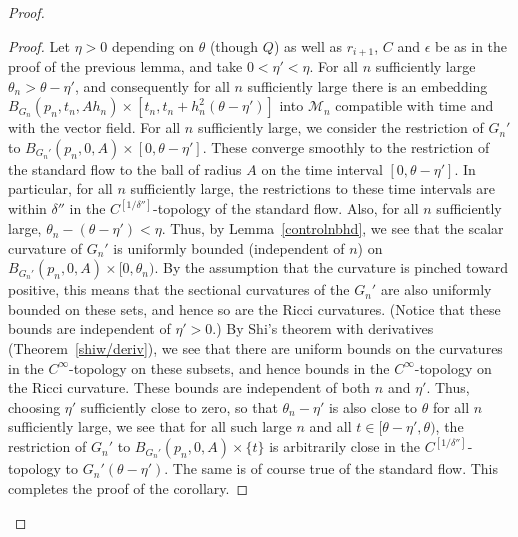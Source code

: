 \begin{proof}
\begin{proof}
Let $\eta>0$ depending on $\theta$ (though $Q$) as well as
$r_{i+1}$, $C$ and $\epsilon$ be as in the proof of the previous
lemma, and take $0<\eta'<\eta$. For all $n$ sufficiently large
$\theta_n>\theta-\eta'$, and consequently for all $n$ sufficiently
large there is an embedding $B_{G_n}(p_n,t_n,Ah_n)\times
[t_n,t_n+h_n^2(\theta-\eta')]$ into ${\mathcal M}_n$ compatible with
time and with the vector field. For all $n$ sufficiently large, we
consider the restriction of $G_n'$ to $B_{G_n'}(p_n,0,A)\times
[0,\theta-\eta']$. These converge smoothly to the restriction of the
standard flow to the ball of radius $A$ on the time interval
$[0,\theta-\eta']$. In particular, for all $n$ sufficiently large,
the restrictions to these time intervals are within $\delta''$ in
the $C^{[1/\delta'']}$-topology of the standard flow. Also, for all $n$ sufficiently
large, $\theta_n-(\theta-\eta')<\eta$. Thus, by
Lemma~\ref{controlnbhd}, we see that the scalar curvature of $G_n'$
is uniformly bounded (independent of $n$) on
$B_{G_n'}(p_n,0,A)\times [0,\theta_n)$. By the assumption that the
curvature is pinched toward positive, this means that the sectional
curvatures of the $G_n'$ are also uniformly bounded on these sets,
and hence so are the Ricci curvatures. (Notice that these bounds are
independent of $\eta'>0$.) By Shi's theorem with derivatives
(Theorem~\ref{shiw/deriv}), we see that there are uniform bounds on
the curvatures in the $C^\infty$-topology on these subsets, and
hence bounds in the $C^\infty$-topology on the Ricci curvature.
These bounds are independent of both $n$ and $\eta'$. Thus, choosing
$\eta'$ sufficiently close to zero, so that $\theta_n-\eta'$ is also
close to $\theta$ for all $n$ sufficiently large, we see that for all such large $n$
and all
$t\in [\theta-\eta',\theta)$,  the
restriction of $G_n'$ to $B_{G_n'}(p_n,0,A)\times \{t\}$ is
arbitrarily close in the $C^{[1/\delta'']}$-topology to
$G_n'(\theta-\eta')$. The same is of course true of the standard
flow. This completes the proof of the corollary.
\end{proof}


\end{proof}
